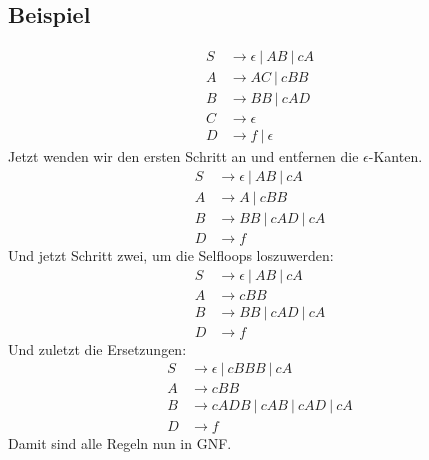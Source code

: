 \documentclass{article}
\begin{document}
\subsection*{Beispiel}
\begin{align*}
S   &\rightarrow \epsilon \ |\ AB \ |\ cA\\
A &\rightarrow AC \ |\ cBB\\
B &\rightarrow BB\ |\ cAD\\
C &\rightarrow \epsilon\\
D &\rightarrow f \ |\ \epsilon
\end{align*}
Jetzt wenden wir den ersten Schritt an und entfernen die $\epsilon$-Kanten.
\begin{align*}
S &\rightarrow \epsilon \ |\ AB \ |\ cA\\
A &\rightarrow A \ |\ cBB\\
B &\rightarrow BB\ |\ cAD\ |\ cA\\
D &\rightarrow f
\end{align*}
Und jetzt Schritt zwei, um die Selfloops loszuwerden:
\begin{align*}
S &\rightarrow \epsilon \ |\ AB \ |\ cA\\
A &\rightarrow cBB\\
B &\rightarrow BB\ |\ cAD\ |\ cA\\
D &\rightarrow f
\end{align*}
Und zuletzt die Ersetzungen:
\begin{align*}
S &\rightarrow \epsilon \ |\ cBBB \ |\ cA\\
A &\rightarrow cBB\\
B &\rightarrow cADB\ |\ cAB\ |\ cAD\ |\ cA\\
D &\rightarrow f
\end{align*}
Damit sind alle Regeln nun in GNF.
\end{document}
